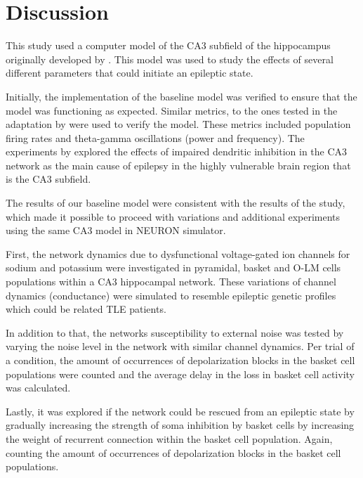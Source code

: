 \chapter{Discussion}

This study used a computer model of the CA3 subfield of the hippocampus originally developed by \textcite{neymotinKetamineDisruptsTheta2011}.
This model was used to study the effects of several different parameters that could initiate an epileptic state.

Initially, the implementation of the baseline model was verified to ensure that the model was functioning as expected.
Similar metrics, to the ones tested in the adaptation by \textcite{sanjayImpairedDendriticInhibition2015} were used to verify the model.
These metrics included population firing rates and theta-gamma oscillations (power and frequency).
The experiments by \textcite{sanjayImpairedDendriticInhibition2015} explored the effects of impaired dendritic inhibition in the CA3 network
as the main cause of epilepsy in the highly vulnerable brain region that is the CA3 subfield.

The results of our baseline model were consistent with the results of the \textcite{sanjayImpairedDendriticInhibition2015} study,
which made it possible to proceed with variations and additional experiments using the same CA3 model in NEURON simulator.

First, the network dynamics due to dysfunctional voltage-gated ion channels for sodium and potassium
were investigated in pyramidal, basket and O-LM cells populations within a CA3 hippocampal network.
These variations of channel dynamics (conductance) were simulated to resemble epileptic genetic profiles which could be related TLE patients.

In addition to that, the networks susceptibility to external noise was tested by varying the noise level in the network with similar channel dynamics.
Per trial of a condition, the amount of occurrences of depolarization blocks in the basket cell populations were counted and the average delay in the
loss in basket cell activity was calculated.

Lastly, it was explored if the network could be rescued from an epileptic state by gradually increasing the strength of soma inhibition by basket cells
by increasing the weight of recurrent connection within the basket cell population. Again, counting the amount of occurrences of depolarization blocks
in the basket cell populations.
\pagebreak

